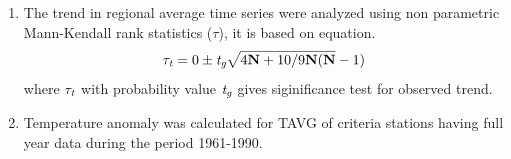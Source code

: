 \documentclass[landscape,final,a0paper,fontscale=0.285]{baposter}
\begin{document}
\begin{poster}
{\begin{multicols}{3}
\begin {minipage}{\linewidth}
\begin{enumerate}
where ${{N}_{\textit k}}$ is number of stations with data at time ${t_{\textit k}}$\\ ${{N}_{\textit j}}$ is number of time points for which station ${\textit j}$ has data,\\ ${(y_{\textit j}(t_{\textit k})}$ is the data record for station ${\textit j}$.
      \item The trend in regional average time series were analyzed using non parametric Mann-Kendall rank statistics ($\tau$), it is based on equation.  
     \begin{equation*}
\tau_{\textit t}= 0 \pm {\textit t}_{\textit g}\sqrt {4{\textbf N+10}/9 {\textbf N}(\textbf N} -1)
\end{equation*}
where $\tau_{\textit t}$ with probability value ${\textit t}_{\textit g}$ gives siginificance test for observed trend.
\item Temperature anomaly was calculated for TAVG of criteria stations having full year data during the period 1961-1990. 
\end{enumerate}
\end{minipage}    
\end{multicols}
   \vspace{0.1em}
  }
\end{poster}
\end{document}
